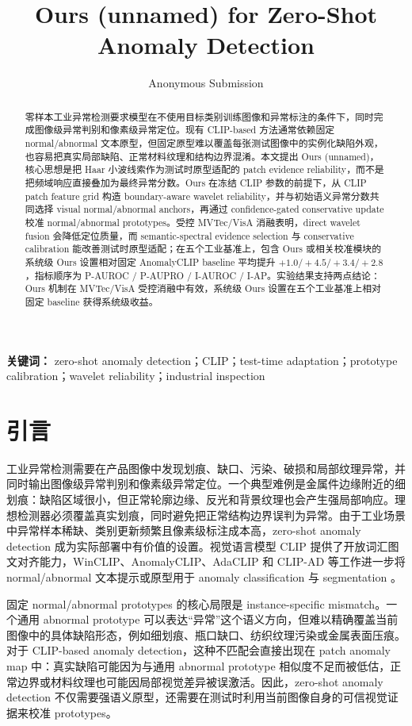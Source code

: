 \documentclass[10pt,a4paper,fontset=none]{ctexart}
\title{Ours (unnamed) for Zero-Shot Anomaly Detection}
\author{Anonymous Submission}
\date{}
\begin{document}
\maketitle

\begin{abstract}
零样本工业异常检测要求模型在不使用目标类别训练图像和异常标注的条件下，同时完成图像级异常判别和像素级异常定位。现有 CLIP-based 方法通常依赖固定 normal/abnormal 文本原型，但固定原型难以覆盖每张测试图像中的实例化缺陷外观，也容易把真实局部缺陷、正常材料纹理和结构边界混淆。本文提出 Ours (unnamed)，核心思想是把 Haar 小波线索作为测试时原型适配的 patch evidence reliability，而不是把频域响应直接叠加为最终异常分数。Ours 在冻结 CLIP 参数的前提下，从 CLIP patch feature grid 构造 boundary-aware wavelet reliability，并与初始语义异常分数共同选择 visual normal/abnormal anchors，再通过 confidence-gated conservative update 校准 normal/abnormal prototypes。受控 MVTec/VisA 消融表明，direct wavelet fusion 会降低定位质量，而 semantic-spectral evidence selection 与 conservative calibration 能改善测试时原型适配；在五个工业基准上，包含 Ours 或相关校准模块的系统级 Ours 设置相对固定 AnomalyCLIP baseline 平均提升 $+1.0 / +4.5 / +3.4 / +2.8$，指标顺序为 P-AUROC / P-AUPRO / I-AUROC / I-AP。实验结果支持两点结论：Ours 机制在 MVTec/VisA 受控消融中有效，系统级 Ours 设置在五个工业基准上相对固定 baseline 获得系统级收益。
\end{abstract}

\noindent\textbf{关键词：} zero-shot anomaly detection；CLIP；test-time adaptation；prototype calibration；wavelet reliability；industrial inspection

\section{引言}

工业异常检测需要在产品图像中发现划痕、缺口、污染、破损和局部纹理异常，并同时输出图像级异常判别和像素级异常定位。一个典型难例是金属件边缘附近的细划痕：缺陷区域很小，但正常轮廓边缘、反光和背景纹理也会产生强局部响应。理想检测器必须覆盖真实划痕，同时避免把正常结构边界误判为异常。由于工业场景中异常样本稀缺、类别更新频繁且像素级标注成本高，zero-shot anomaly detection 成为实际部署中有价值的设置。视觉语言模型 CLIP 提供了开放词汇图文对齐能力，WinCLIP、AnomalyCLIP、AdaCLIP 和 CLIP-AD 等工作进一步将 normal/abnormal 文本提示或原型用于 anomaly classification 与 segmentation \cite{radford2021clip,jeong2023winclip,zhou2024anomalyclip,cao2024adaclip,chen2024clipad}。

固定 normal/abnormal prototypes 的核心局限是 instance-specific mismatch。一个通用 abnormal prototype 可以表达“异常”这个语义方向，但难以精确覆盖当前图像中的具体缺陷形态，例如细划痕、瓶口缺口、纺织纹理污染或金属表面压痕。对于 CLIP-based anomaly detection，这种不匹配会直接出现在 patch anomaly map 中：真实缺陷可能因为与通用 abnormal prototype 相似度不足而被低估，正常边界或材料纹理也可能因局部视觉差异被误激活。因此，zero-shot anomaly detection 不仅需要强语义原型，还需要在测试时利用当前图像自身的可信视觉证据来校准 prototypes。
\end{document}
